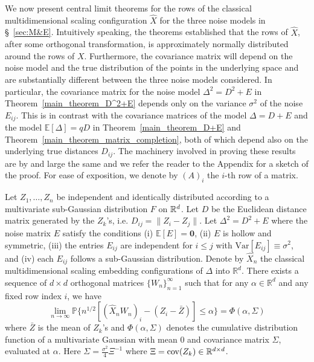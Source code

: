 We now present central limit theorems for
the rows of the classical multidimensional scaling configuration $\hat{X}$ for the three noise
models in \S~\ref{sec:M&E}. Intuitively speaking, the theorems
established that the rows of $\hat{X}$, after some orthogonal
transformation, is approximately normally distributed around the rows
of $X$. Furthermore, the covariance matrix will depend on the noise
model and the true distribution of the points in the underlying space
and are substantially different between the three noise models
considered. In particular, the covariance matrix for the noise model
$\Delta^2 = D^2 + E$ in Theorem~\ref{main_theorem_D^2+E} depends only
on the variance $\sigma^2$ of the noise $E_{ij}$.  This is in contrast
with the covariance matrices of the model $\Delta = D + E$ and the
model $\mathbb{E}[\Delta] = q D$ in Theorem~\ref{main_theorem_D+E} and
Theorem~\ref{main_theorem_matrix_completion}, both of which depend
also on the underlying true distances $D_{ij}$. The machinery involved
in proving these results are by and large the same and we refer the
reader to the Appendix for a sketch of the proof. For ease of
exposition, we denote by $(A)_i$ the $i$-th row of a matrix.  

\begin{theorem}[central limit theorem for $\Delta^2 = D^2 + E$]
\label{main_theorem_D^2+E}%
Let $Z_1, \dots, Z_n$ be independent and identically distributed
according to a multivariate sub-Gaussian distribution $F$ on ${\mathbb R}^d$. Let $D$ be the Euclidean
distance matrix generated by the $Z_k$'s, i.e. $D_{ij} = \|Z_i -
Z_j\|$. 
Let $\Delta^2 = D^2 + E$ where the noise matrix $E$ satisfy the conditions (i) $\mathbb{E}[E] = \bm{0}$, (ii) $E$ is hollow and
symmetric, (iii) the entries $E_{ij}$ are independent for $i \leq j$
with $\mathrm{Var}[E_{ij}] \equiv \sigma^2$, and (iv) each $E_{ij}$
follows a sub-Gaussian distribution.  Denote by $\hat{X}_n$ the
classical multidimensional scaling embedding configurations of
$\Delta$ into $\mathbb{R}^{d}$. There exists a sequence of $d
\times d$ orthogonal matrices $\{W_n\}_{n=1}^{\infty}$ such that for
any $\alpha \in \mathbb{R}^{d}$ and any fixed row index $i$, we have
$$ \lim_{n {\to} \infty} \mathbb{P} \{n^{1/2} [(\hat{X}_n W_n)_i - (Z_i - \bar{Z}) ]\leq \alpha\} = \Phi(\alpha, \Sigma) $$
  where $\bar{Z}$ is the mean of $Z_k$'s and $\Phi(\alpha, \Sigma)$
denotes the cumulative distribution function of a multivariate Gaussian with mean $0$ and
covariance matrix $\Sigma$, evaluated at $\alpha$.  Here $\Sigma =
\frac{\sigma^2}{4} {\Xi}^{-1}$ where $\Xi = \mathrm{cov}(Z_k) \in
{\mathbb R}^{d \times d}$.
\end{theorem}

